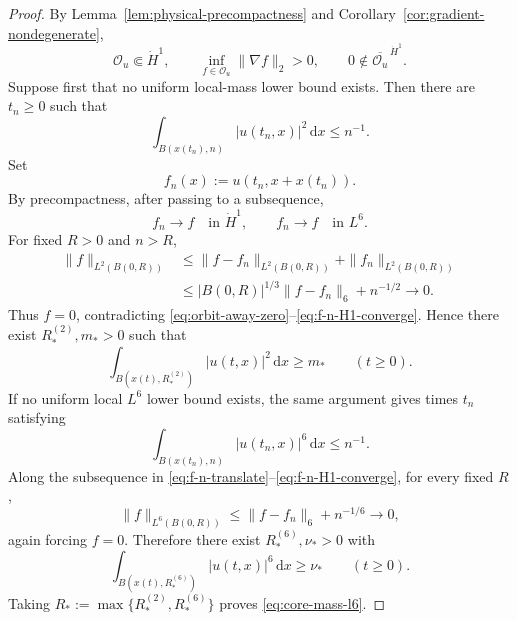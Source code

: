 \documentclass{interact}
\numberwithin{equation}{section}
\theoremstyle{plain}
\theoremstyle{definition}
\theoremstyle{remark}
\newcommand{\dd}{\,\mathrm d}
\begin{document}
\begin{proof}
By Lemma~\ref{lem:physical-precompactness} and Corollary~\ref{cor:gradient-nondegenerate},
\begin{equation}\label{eq:orbit-away-zero}
 \mathcal O_u\Subset\dot H^1,
 \qquad
 \inf_{f\in\mathcal O_u}\|\nabla f\|_2>0,
 \qquad
 0\notin\overline{\mathcal O_u}^{\,\dot H^1}.
\end{equation}
Suppose first that no uniform local-mass lower bound exists. Then there are $t_n\ge0$ such that
\[
 \int_{B(x(t_n),n)}|u(t_n,x)|^2\dd x\le n^{-1}.
\]
Set
\begin{equation}\label{eq:f-n-translate}
 f_n(x):=u(t_n,x+x(t_n)).
\end{equation}
By precompactness, after passing to a subsequence,
\begin{equation}\label{eq:f-n-H1-converge}
 f_n\to f\quad\text{in }\dot H^1,
 \qquad
 f_n\to f\quad\text{in }L^6.
\end{equation}
For fixed $R>0$ and $n>R$,
\begin{align*}
 \|f\|_{L^2(B(0,R))}
 &\le\|f-f_n\|_{L^2(B(0,R))}
     +\|f_n\|_{L^2(B(0,R))}\\
 &\le |B(0,R)|^{1/3}\|f-f_n\|_6+n^{-1/2}
 \longrightarrow0.
\end{align*}
Thus $f=0$, contradicting \eqref{eq:orbit-away-zero}--\eqref{eq:f-n-H1-converge}. Hence there exist $R_*^{(2)},m_*>0$ such that
\[
 \int_{B(x(t),R_*^{(2)})}|u(t,x)|^2\dd x\ge m_*
 \qquad(t\ge0).
\]
If no uniform local $L^6$ lower bound exists, the same argument gives times $t_n$ satisfying
\[
 \int_{B(x(t_n),n)}|u(t_n,x)|^6\dd x\le n^{-1}.
\]
Along the subsequence in \eqref{eq:f-n-translate}--\eqref{eq:f-n-H1-converge}, for every fixed $R$,
\[
 \|f\|_{L^6(B(0,R))}
 \le\|f-f_n\|_6+n^{-1/6}
 \longrightarrow0,
\]
again forcing $f=0$. Therefore there exist $R_*^{(6)},\nu_*>0$ with
\[
 \int_{B(x(t),R_*^{(6)})}|u(t,x)|^6\dd x\ge\nu_*
 \qquad(t\ge0).
\]
Taking $R_*:=\max\{R_*^{(2)},R_*^{(6)}\}$ proves \eqref{eq:core-mass-l6}.
\end{proof}
\end{document}
